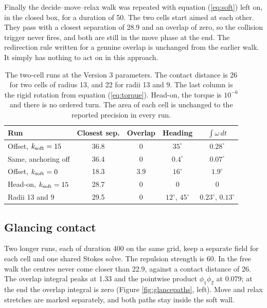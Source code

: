 \documentclass[11pt]{article}
\begin{document}
Finally the decide--move--relax walk was repeated with equation (\ref{eq:soft}) left on, in the closed box, for a duration of 50. The two cells start aimed at each other. They pass with a closest separation of 28.9 and an overlap of zero, so the collision trigger never fires, and both are still in the move phase at the end. The redirection rule written for a genuine overlap is unchanged from the earlier walk. It simply has nothing to act on in this approach.

\begin{table}[ht!]
\begin{center}
\begin{tabular}{|l|c|c|c|c|}
\hline
Run & Closest sep. & Overlap & Heading & $\int\omega\,dt$ \\
\hline
Offset, $k_{\rm soft}=15$ & 36.8 & 0 & $35^{\circ}$ & $0.28^{\circ}$ \\
Same, anchoring off & 36.4 & 0 & $0.4^{\circ}$ & $0.07^{\circ}$ \\
Offset, $k_{\rm soft}=0$ & 18.3 & 3.9 & $16^{\circ}$ & $1.9^{\circ}$ \\
Head-on, $k_{\rm soft}=15$ & 28.7 & 0 & 0 & 0 \\
Radii 13 and 9 & 29.5 & 0 & $12^{\circ}$, $45^{\circ}$ & $0.23^{\circ}$, $0.13^{\circ}$ \\
\hline
\end{tabular}
\end{center}
\caption{The two-cell runs at the Version 3 parameters. The contact distance is 26 for two cells of radius 13, and 22 for radii 13 and 9. The last column is the rigid rotation from equation (\ref{eq:torque}). Head-on, the torque is $10^{-6}$ and there is no ordered turn. The area of each cell is unchanged to the reported precision in every run.}
\label{tab:twocell}
\end{table}

\FloatBarrier
\subsection{Glancing contact}
\label{sec:glance}

Two longer runs, each of duration 400 on the same grid, keep a separate field for each cell and one shared Stokes solve. The repulsion strength is 60. In the free walk the centres never come closer than 22.9, against a contact distance of 26. The overlap integral peaks at 1.33 and the pointwise product $\phi_{1}\phi_{2}$ at 0.079; at the end the overlap integral is zero (Figure \ref{fig:glancepaths}, left). Move and relax stretches are marked separately, and both paths stay inside the soft wall.
\end{document}
